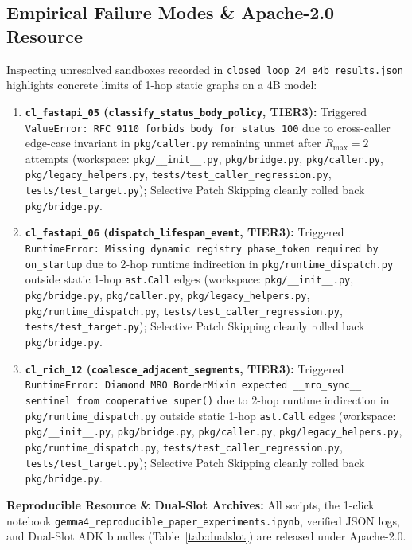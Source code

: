 \documentclass[10pt,twocolumn,letterpaper]{article}
\begin{document}
\subsection{Empirical Failure Modes \& Apache-2.0 Resource}
Inspecting unresolved sandboxes recorded in \texttt{closed\_loop\_24\_e4b\_results.json} highlights concrete limits of 1-hop static graphs on a 4B model:
\begin{enumerate}
    \item \textbf{\texttt{cl\_fastapi\_05} (\texttt{classify\_status\_body\_policy}, TIER3):} Triggered \texttt{ValueError: RFC 9110 forbids body for status 100} due to cross-caller edge-case invariant in \texttt{pkg/caller.py} remaining unmet after $R_{\max}{=}2$ attempts (workspace: \texttt{pkg/\_\_init\_\_.py}, \texttt{pkg/bridge.py}, \texttt{pkg/caller.py}, \texttt{pkg/legacy\_helpers.py}, \texttt{tests/test\_caller\_regression.py}, \texttt{tests/test\_target.py}); Selective Patch Skipping cleanly rolled back \texttt{pkg/bridge.py}.
    \item \textbf{\texttt{cl\_fastapi\_06} (\texttt{dispatch\_lifespan\_event}, TIER3):} Triggered \texttt{RuntimeError: Missing dynamic registry phase\_token required by on\_startup} due to 2-hop runtime indirection in \texttt{pkg/runtime\_dispatch.py} outside static 1-hop \texttt{ast.Call} edges (workspace: \texttt{pkg/\_\_init\_\_.py}, \texttt{pkg/bridge.py}, \texttt{pkg/caller.py}, \texttt{pkg/legacy\_helpers.py}, \texttt{pkg/runtime\_dispatch.py}, \texttt{tests/test\_caller\_regression.py}, \texttt{tests/test\_target.py}); Selective Patch Skipping cleanly rolled back \texttt{pkg/bridge.py}.
    \item \textbf{\texttt{cl\_rich\_12} (\texttt{coalesce\_adjacent\_segments}, TIER3):} Triggered \texttt{RuntimeError: Diamond MRO BorderMixin expected \_\_mro\_sync\_\_ sentinel from cooperative super()} due to 2-hop runtime indirection in \texttt{pkg/runtime\_dispatch.py} outside static 1-hop \texttt{ast.Call} edges (workspace: \texttt{pkg/\_\_init\_\_.py}, \texttt{pkg/bridge.py}, \texttt{pkg/caller.py}, \texttt{pkg/legacy\_helpers.py}, \texttt{pkg/runtime\_dispatch.py}, \texttt{tests/test\_caller\_regression.py}, \texttt{tests/test\_target.py}); Selective Patch Skipping cleanly rolled back \texttt{pkg/bridge.py}.
\end{enumerate}
\noindent\textbf{Reproducible Resource \& Dual-Slot Archives:} All scripts, the 1-click notebook \texttt{gemma4\_reproducible\_paper\_experiments.ipynb}, verified JSON logs, and Dual-Slot ADK bundles (Table~\ref{tab:dualslot}) are released under Apache-2.0.
\end{document}
